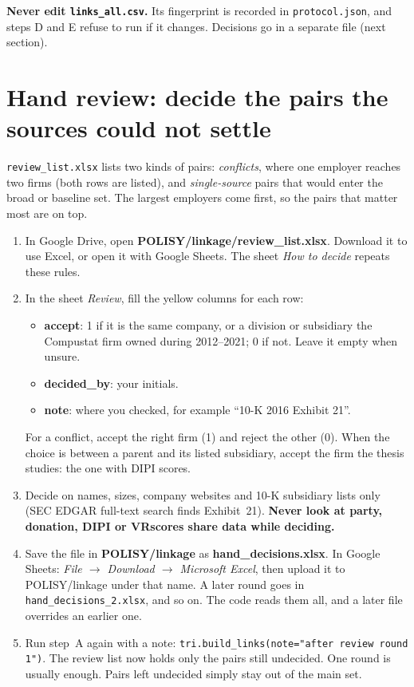 \documentclass[11pt,a4paper]{article}
\newcommand{\file}[1]{\texttt{#1}}
\begin{document}
\textbf{Never edit \file{links\_all.csv}.} Its fingerprint is recorded in \file{protocol.json}, and steps D and E refuse to run if it changes. Decisions go in a separate file (next section).

\section{Hand review: decide the pairs the sources could not settle}\label{sec:review}

\file{review\_list.xlsx} lists two kinds of pairs: \emph{conflicts}, where one employer reaches two firms (both rows are listed), and \emph{single-source} pairs that would enter the broad or baseline set. The largest employers come first, so the pairs that matter most are on top.

\begin{enumerate}\setlength{\itemsep}{3pt}
\item In Google Drive, open \textbf{POLISY/linkage/review\_list.xlsx}. Download it to use Excel, or open it with Google Sheets. The sheet \emph{How to decide} repeats these rules.
\item In the sheet \emph{Review}, fill the yellow columns for each row:
  \begin{itemize}\setlength{\itemsep}{1pt}
  \item \textbf{accept}: 1 if it is the same company, or a division or subsidiary the Compustat firm owned during 2012--2021; 0 if not. Leave it empty when unsure.
  \item \textbf{decided\_by}: your initials.
  \item \textbf{note}: where you checked, for example ``10-K 2016 Exhibit 21''.
  \end{itemize}
  For a conflict, accept the right firm (1) and reject the other (0). When the choice is between a parent and its listed subsidiary, accept the firm the thesis studies: the one with DIPI scores.
\item Decide on names, sizes, company websites and 10-K subsidiary lists only (SEC EDGAR full-text search finds Exhibit~21). \textbf{Never look at party, donation, DIPI or VRscores share data while deciding.}
\item Save the file in \textbf{POLISY/linkage} as \textbf{hand\_decisions.xlsx}. In Google Sheets: \emph{File $\to$ Download $\to$ Microsoft Excel}, then upload it to POLISY/linkage under that name. A later round goes in \file{hand\_decisions\_2.xlsx}, and so on. The code reads them all, and a later file overrides an earlier one.
\item Run step~A again with a note: \texttt{tri.build\_links(note="after review round 1")}. The review list now holds only the pairs still undecided. One round is usually enough. Pairs left undecided simply stay out of the main set.
\end{enumerate}
\end{document}
